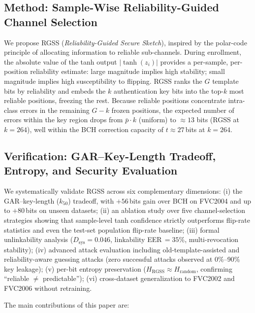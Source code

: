 \documentclass[journal]{IEEEtran}
\begin{document}
\subsection*{Method: Sample-Wise Reliability-Guided Channel Selection}

We propose RGSS (\emph{Reliability-Guided Secure Sketch}), inspired
by the polar-code principle \cite{arikan2009channel} of allocating information to reliable
sub-channels.
During enrollment, the absolute value of the tanh output
$|\tanh(z_i)|$ provides a per-sample, per-position reliability
estimate: large magnitude implies high stability; small magnitude
implies high susceptibility to flipping.
RGSS ranks the $G$ template bits by reliability and embeds the $k$
authentication key bits into the top-$k$ most reliable positions,
freezing the rest.
Because reliable positions concentrate intra-class errors
in the remaining $G-k$ frozen positions, the expected number of
errors within the key region drops from $\bar{p} \cdot k$
(uniform) to $\approx\!13$ bits (RGSS at $k\!=\!264$),
well within the BCH correction capacity of $t\!\approx\!27$\,bits
at $k\!=\!264$.

\subsection*{Verification: GAR--Key-Length Tradeoff, Entropy, and Security Evaluation}

We systematically validate RGSS across six complementary dimensions:
(i) the GAR--key-length ($k_{50}$) tradeoff, with $+56$\,bits gain
over BCH on FVC2004 and up to $+80$\,bits on unseen datasets;
(ii) an ablation study over five channel-selection strategies showing
that sample-level tanh confidence strictly outperforms flip-rate
statistics and even the test-set population flip-rate baseline;
(iii) formal unlinkability analysis ($D_\text{sys}\!=\!0.046$,
linkability EER\,$=35\%$, multi-revocation stability);
(iv) advanced attack evaluation including old-template-assisted
and reliability-aware guessing attacks (zero successful attacks observed
at 0\%--90\% key leakage);
(v) per-bit entropy preservation
($H_\text{RGSS} \approx H_\text{random}$, confirming
``reliable $\neq$ predictable'');
(vi) cross-dataset generalization to FVC2002 and FVC2006 without
retraining.

The main contributions of this paper are:
\end{document}

